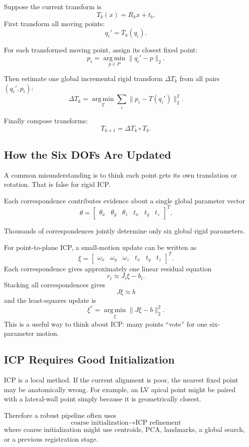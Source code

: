 \documentclass[11pt,a4paper]{article}
\newcommand{\argmin}{\operatorname*{arg\,min}}
\begin{document}
Suppose the current transform is
\[
T_k(x)=R_kx+t_k.
\]
First transform all moving points:
\[
q_i'=T_k(q_i).
\]

For each transformed moving point, assign its closest fixed point:
\[
\boxed{
p_i
=
\argmin_{p\in P}\|q_i'-p\|_2
}.
\]

Then estimate one global incremental rigid transform $\Delta T_k$ from all pairs $(q_i',p_i)$:
\[
\Delta T_k
=
\argmin_T\sum_i\|p_i-T(q_i')\|_2^2.
\]

Finally compose transforms:
\[
\boxed{T_{k+1}=\Delta T_k\circ T_k.}
\]

\subsection{How the Six DOFs Are Updated}

A common misunderstanding is to think each point gets its own translation or rotation. That is false for rigid ICP.

Each correspondence contributes evidence about a single global parameter vector
\[
\theta=
\begin{bmatrix}
\theta_x&\theta_y&\theta_z&t_x&t_y&t_z
\end{bmatrix}^T.
\]

Thousands of correspondences jointly determine only six global rigid parameters.

For point-to-plane ICP, a small-motion update can be written as
\[
\xi=
\begin{bmatrix}
\omega_x&\omega_y&\omega_z&t_x&t_y&t_z
\end{bmatrix}^T.
\]
Each correspondence gives approximately one linear residual equation
\[
r_i\approx J_i\xi-b_i.
\]
Stacking all correspondences gives
\[
J\xi\approx b
\]
and the least-squares update is
\[
\boxed{
\xi^*=\argmin_\xi\|J\xi-b\|_2^2.
}
\]
This is a useful way to think about ICP: many points ``vote'' for one six-parameter motion.

\subsection{ICP Requires Good Initialization}

ICP is a local method. If the current alignment is poor, the nearest fixed point may be anatomically wrong. For example, an LV apical point might be paired with a lateral-wall point simply because it is geometrically closest.

Therefore a robust pipeline often uses
\[
\boxed{
\text{coarse initialization}
\rightarrow
\text{ICP refinement}
}
\]
where coarse initialization might use centroids, PCA, landmarks, a global search, or a previous registration stage.
\end{document}
